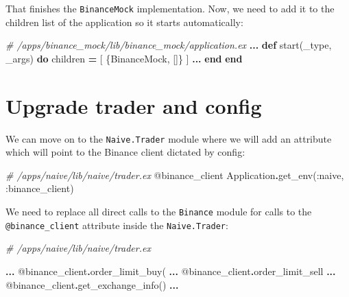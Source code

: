 \documentclass[
]{book}
\newenvironment{Shaded}{\begin{snugshade}}{\end{snugshade}}
\newcommand{\CommentTok}[1]{\textcolor[rgb]{0.56,0.35,0.01}{\textit{#1}}}
\newcommand{\ConstantTok}[1]{\textcolor[rgb]{0.00,0.00,0.00}{#1}}
\newcommand{\KeywordTok}[1]{\textcolor[rgb]{0.13,0.29,0.53}{\textbf{#1}}}
\newcommand{\NormalTok}[1]{#1}
\newcommand{\OperatorTok}[1]{\textcolor[rgb]{0.81,0.36,0.00}{\textbf{#1}}}
\newcommand{\OtherTok}[1]{\textcolor[rgb]{0.56,0.35,0.01}{#1}}
\newcommand{\VariableTok}[1]{\textcolor[rgb]{0.00,0.00,0.00}{#1}}
\begin{document}
That finishes the \texttt{BinanceMock} implementation. Now, we need to add it to
the children list of the application so it starts automatically:

\begin{Shaded}
\begin{Highlighting}[]
\CommentTok{\# /apps/binance\_mock/lib/binance\_mock/application.ex}
\OperatorTok{...}
  \KeywordTok{def}\NormalTok{ start(\_type, \_args) }\KeywordTok{do}
\NormalTok{    children }\OperatorTok{=}\NormalTok{ [}
\NormalTok{      \{}\ConstantTok{BinanceMock}\NormalTok{, []\}}
\NormalTok{    ]}
    \OperatorTok{...}
  \KeywordTok{end}
\KeywordTok{end}
\end{Highlighting}
\end{Shaded}

\hypertarget{upgrade-trader-and-config}{%
\section{Upgrade trader and config}\label{upgrade-trader-and-config}}

We can move on to the \texttt{Naive.Trader} module where we will add an attribute which will point to the Binance client dictated by config:

\begin{Shaded}
\begin{Highlighting}[]
  \CommentTok{\# /apps/naive/lib/naive/trader.ex}
  \OtherTok{@binance\_client} \ConstantTok{Application}\OperatorTok{.}\NormalTok{get\_env(}\VariableTok{:naive}\NormalTok{, }\VariableTok{:binance\_client}\NormalTok{)}
\end{Highlighting}
\end{Shaded}

We need to replace all direct calls to the \texttt{Binance} module for calls to the \texttt{@binance\_client} attribute inside the \texttt{Naive.Trader}:

\begin{Shaded}
\begin{Highlighting}[]
\CommentTok{\# /apps/naive/lib/naive/trader.ex}

\OperatorTok{...}
  \OtherTok{@binance\_client}\OperatorTok{.}\NormalTok{order\_limit\_buy(}
\OperatorTok{...}
  \OtherTok{@binance\_client}\OperatorTok{.}\NormalTok{order\_limit\_sell}
\OperatorTok{...}
  \OtherTok{@binance\_client}\OperatorTok{.}\NormalTok{get\_exchange\_info()}
\OperatorTok{...}
\end{Highlighting}
\end{Shaded}
\end{document}
